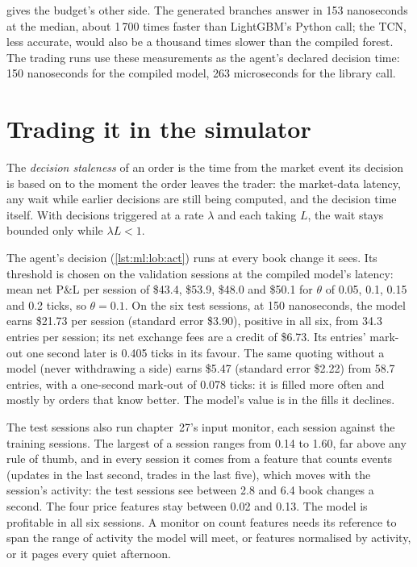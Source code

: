  gives the budget's other side. The generated branches answer in 153 nanoseconds at the median, about
1\,700 times faster than LightGBM's Python call; the TCN, less accurate, would also be a thousand times slower than the compiled
forest. The trading runs use these measurements as the agent's declared decision time: 150 nanoseconds for the compiled model,
263 microseconds for the library call.

\section{Trading it in the simulator}

\begin{definition}\label{def:ml:build-an-order-book-model-end-to-end:staleness}
The \emph{decision staleness} of an order is the time from the market event its decision is based on to
the moment the order leaves the trader: the market-data latency, any wait while earlier decisions are still being computed, and the
decision time itself. With decisions triggered at a rate $\lambda$ and each taking $L$, the wait stays bounded only while
$\lambda L<1$.
\end{definition}

The agent's decision (\cref{lst:ml:lob:act}) runs at every book change it sees. Its threshold is chosen on the validation sessions
at the compiled model's latency: mean net P\&L per session of \$43.4, \$53.9, \$48.0 and \$50.1 for $\theta$ of 0.05, 0.1, 0.15 and
0.2 ticks, so $\theta=0.1$. On the six test sessions, at 150 nanoseconds, the model earns \$21.73 per session (standard error
\$3.90), positive in all six, from 34.3 entries per session; its net exchange fees are a credit of \$6.73. Its entries' mark-out one second
later is 0.405 ticks in its favour. The same quoting without a model (never withdrawing a side) earns \$5.47 (standard error
\$2.22) from 58.7 entries, with a one-second mark-out of 0.078 ticks: it is filled more often and mostly by orders that know
better. The model's value is in the fills it declines.

The test sessions also run chapter~27's input monitor, each session against the training sessions. The largest  of a session ranges from 0.14 to 1.60, far above any rule of thumb, and in every session it comes from a feature
that counts events (updates in the last second, trades in the last five), which moves with the session's activity: the test
sessions see between 2.8 and 6.4 book changes a second. The four price features stay between 0.02 and 0.13. The model is profitable
in all six sessions. A monitor on count features needs its reference to span the range of activity the model will meet, or
features normalised by activity, or it pages every quiet afternoon.

